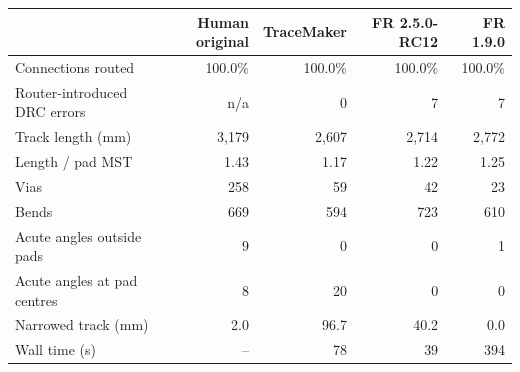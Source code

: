 \begin{tabular}{lrrrr}
\toprule
 & Human original & TraceMaker & FR 2.5.0-RC12 & FR 1.9.0 \\
\midrule
Connections routed & 100.0\% & 100.0\% & 100.0\% & 100.0\% \\
Router-introduced DRC errors & n/a & 0 & 7 & 7 \\
Track length (mm) & 3,179 & 2,607 & 2,714 & 2,772 \\
Length / pad MST & 1.43 & 1.17 & 1.22 & 1.25 \\
Vias & 258 & 59 & 42 & 23 \\
Bends & 669 & 594 & 723 & 610 \\
Acute angles outside pads & 9 & 0 & 0 & 1 \\
Acute angles at pad centres & 8 & 20 & 0 & 0 \\
Narrowed track (mm) & 2.0 & 96.7 & 40.2 & 0.0 \\
Wall time (s) & -- & 78 & 39 & 394 \\
\bottomrule
\end{tabular}
